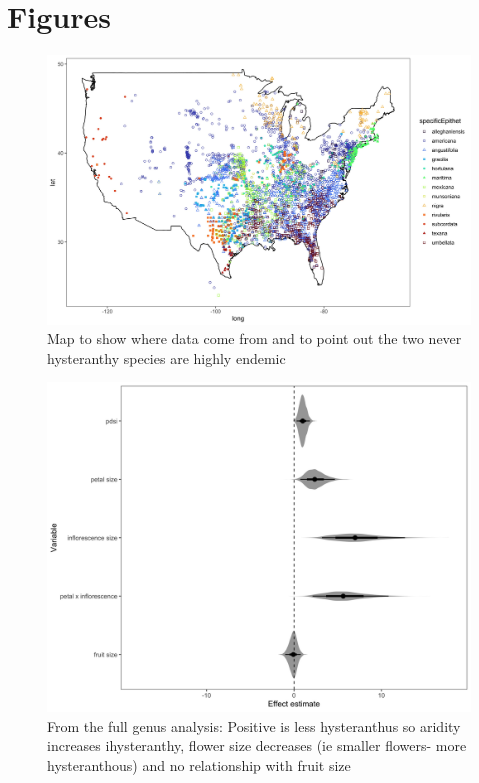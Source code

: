 \documentclass{article}\usepackage[]{graphicx}\usepackage[]{color}
\begin{document}
\section*{Figures}
    \begin{figure}[h!]
    \centering
 \includegraphics[width=\textwidth]{..//..//Plots/map.jpeg}
    \caption{Map to show where data come from and to point out the two never hysteranthy species are highly endemic}
    \label{fig:mappy}
\end{figure}

\begin{figure}[h!]
    \centering
 \includegraphics[width=\textwidth]{..//..//Plots/fullprunus_mus.jpeg}
    \caption{From the full genus analysis: Positive is less hysteranthus so aridity increases ihysteranthy, flower size decreases (ie smaller flowers- more hysteranthous) and no relationship with fruit size }
    \label{fig:cherries}
\end{figure}
\end{document}
